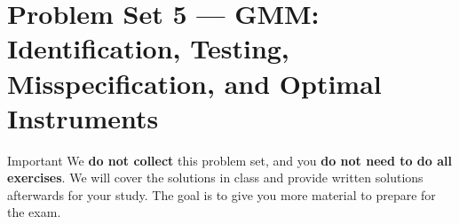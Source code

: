 \documentclass[12pt]{article}
\theoremstyle{definition}
\theoremstyle{plain}
\begin{document}

\section*{Problem Set 5 --- GMM: Identification, Testing, Misspecification, and Optimal Instruments}

\begin{alertblock}{Important}
We \textbf{do not collect} this problem set, and you \textbf{do not need to do all exercises}.
We will cover the solutions in class and provide written solutions afterwards for your study.
The goal is to give you more material to prepare for the exam.
\end{alertblock}

\vspace{0.8em}
\end{document}
